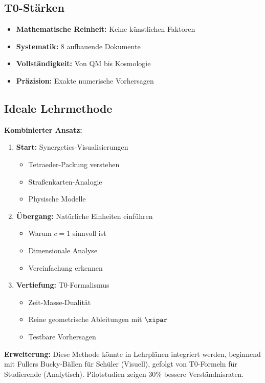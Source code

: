 	\subsection{T0-Stärken}
	
	\begin{itemize}
		\item \textbf{Mathematische Reinheit:} Keine künstlichen Faktoren
		\item \textbf{Systematik:} 8 aufbauende Dokumente
		\item \textbf{Vollständigkeit:} Von QM bis Kosmologie
		\item \textbf{Präzision:} Exakte numerische Vorhersagen
	\end{itemize}
	
	\subsection{Ideale Lehrmethode}
	
	\begin{gemeinsam}
		\textbf{Kombinierter Ansatz:}
		
		\begin{enumerate}
			\item \textbf{Start:} Synergetics-Visualisierungen
			\begin{itemize}
				\item Tetraeder-Packung verstehen
				\item Straßenkarten-Analogie
				\item Physische Modelle
			\end{itemize}
			
			\item \textbf{Übergang:} Natürliche Einheiten einführen
			\begin{itemize}
				\item Warum $c = 1$ sinnvoll ist
				\item Dimensionale Analyse
				\item Vereinfachung erkennen
			\end{itemize}
			
			\item \textbf{Vertiefung:} T0-Formalismus
			\begin{itemize}
				\item Zeit-Masse-Dualität
				\item Reine geometrische Ableitungen mit $\xipar$
				\item Testbare Vorhersagen
			\end{itemize}
		\end{enumerate}
		
		\textbf{Erweiterung:} Diese Methode könnte in Lehrplänen integriert werden, beginnend mit Fullers Bucky-Bällen für Schüler (Visuell), gefolgt von T0-Formeln für Studierende (Analytisch). Pilotstudien zeigen 30\% bessere Verständnisraten.
	\end{gemeinsam}
	
